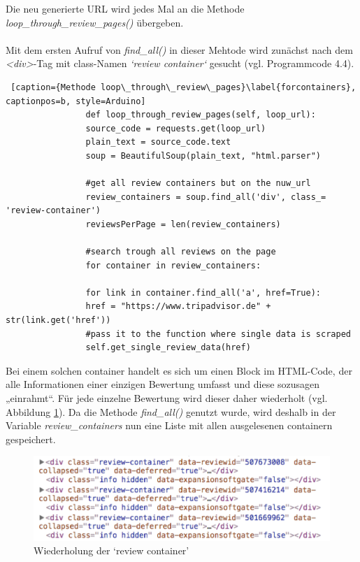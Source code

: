 \documentclass[a4paper,oneside,12pt]{report}
\begin{document}
				Die neu generierte URL wird jedes Mal an die Methode \textit{loop\_through\_review\_pages()} übergeben.
				\\
				\\
				Mit dem ersten Aufruf von \textit{find\_all()} in dieser Mehtode wird zunächst nach dem \textit{<div>}-Tag mit class-Namen \textit{‘review container‘} gesucht (vgl. Programmcode 4.4). 
				\\
				\begin{lstlisting} [caption={Methode loop\_through\_review\_pages}\label{forcontainers}, captionpos=b, style=Arduino]
				def loop_through_review_pages(self, loop_url):
				source_code = requests.get(loop_url)
				plain_text = source_code.text
				soup = BeautifulSoup(plain_text, "html.parser")
				
				#get all review containers but on the nuw_url
				review_containers = soup.find_all('div', class_= 'review-container')
				reviewsPerPage = len(review_containers)
				
				#search trough all reviews on the page
				for container in review_containers:
				
				for link in container.find_all('a', href=True):
				href = "https://www.tripadvisor.de" + str(link.get('href'))
				#pass it to the function where single data is scraped
				self.get_single_review_data(href)
				\end{lstlisting}
				Bei einem solchen container handelt es sich um einen Block im HTML-Code, der alle Informationen einer einzigen Bewertung umfasst und diese sozusagen „einrahmt“. Für jede einzelne Bewertung wird dieser daher wiederholt (vgl. Abbildung \ref{pic-reviewcontainer}). Da die Methode \textit{find\_all()} genutzt wurde, wird deshalb in der Variable \textit{review\_containers} nun eine Liste mit allen ausgelesenen containern gespeichert.
				\begin{figure}[H]
					\centering
					\begin{minipage}[b]{0.9\textwidth}
						\includegraphics[width=\textwidth]{Bilder/reviewcontainer.png}
					\end{minipage}
					\centering
					\caption[Review Container]{Wiederholung der ‘review container' \cite{bib-reviewcontainer}}
					\label{pic-reviewcontainer}
				\end{figure}
\end{document}
